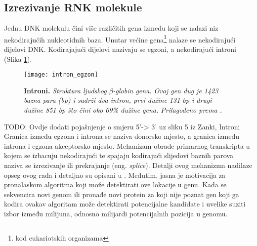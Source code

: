 \subsection{Izrezivanje RNK molekule}
Jednu DNK molekulu čini više različitih gena između koji se nalazi niz nekodirajućih nukleotidnih baza. Unutar većine gena\footnote{kod eukariotskih organizama} nalaze se nekodirajući dijelovi DNK. Kodirajajući dijelovi nazivaju se egzoni, a nekodirajući introni (Slika \ref{fig:gene}). 

\begin{center}
   \begin{figure}[ht!]
      \begin{center}
         \texttt{[image: intron\_egzon]}
                 \caption[Introni]{\textbf{Introni.} \textit{Struktura ljudskog $\beta$-globin gena. Ovaj gen dug je 1423 bazna para (bp) i sadrži dva intron, prvi dužine 131 bp i drugi dužine 851 bp što čini oko 69\% dužine gena. Prilagođeno prema \cite{Brown01}.}}
         \label{fig:gene}
      \end{center}
   \end{figure}
\end{center}

TODO: Ovdje dodati pojašnjenje o smjeru 5'-> 3' uz sliku 5 iz Zanki, Introni
Granica između egzona i introna se naziva donorsko mjesto, a granica između introna i egzona akceptorsko mjesto. Mehanizam obrade primarnog transkripta u kojem se izbacuju nekodirajući te spajaju kodirajući slijedovi baznih parova naziva se izrezivanje ili prekrajanje (eng. \textit{splice}). Detalji ovog mehanizma nadilaze opseg ovog rada i detaljno su opisani u \cite{Brown01, Cox01}. Međutim, jasna je motivacija za pronalaskom algoritma koji može detektirati ove lokacije u genu. Kada se sekvencira novi genom ili pronađe novi protein za koji nije poznat gen koji ga kodira ovakav algoritam može detektirati potencijalne kandidate i uvelike suziti izbor između milijuna, odnosno milijardi potencijalnih pozicija u genomu.

